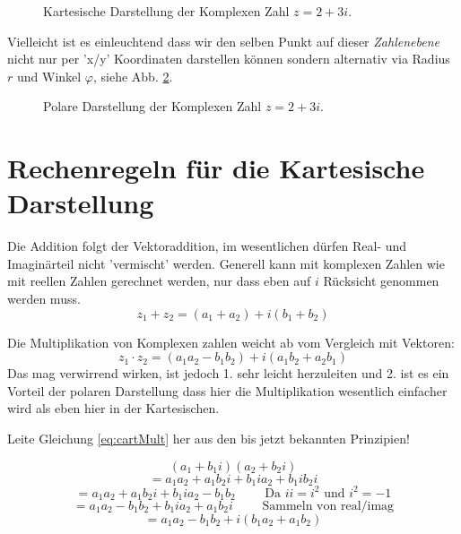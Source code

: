\begin{figure}[h]
	\centering
	
	\caption{Kartesische Darstellung der Komplexen Zahl $z = 2 + 3i$.}
	\label{fig:komp_kart}
\end{figure}

Vielleicht ist es einleuchtend dass wir den selben Punkt auf dieser \emph{Zahlenebene} nicht nur per 'x/y' Koordinaten darstellen können sondern alternativ via Radius $r$ und Winkel $\varphi$, siehe Abb. \ref{fig:komp_pol}.


\begin{figure}[h]
	\centering
	
	\caption{Polare Darstellung der Komplexen Zahl $z = 2 + 3i$.}
	\label{fig:komp_pol}
\end{figure}




\section{Rechenregeln für die Kartesische Darstellung}

Die Addition folgt der Vektoraddition, im wesentlichen dürfen Real- und Imaginärteil nicht 'vermischt' werden. Generell kann mit komplexen Zahlen wie mit reellen Zahlen gerechnet werden, nur dass eben auf $i$ Rücksicht genommen werden muss.
\begin{equation}
z_1 + z_2 = (a_1 + a_2) + i(b_1 + b_2)
\end{equation}


Die Multiplikation von Komplexen zahlen weicht ab vom Vergleich mit Vektoren:  
\begin{equation}\label{eq:cartMult}
z_1 \cdot z_2 = (a_1 a_2 - b_1 b_2)  + i(a_1 b_2 +a_2 b_1)
\end{equation}
Das mag verwirrend wirken, ist jedoch 1. sehr leicht herzuleiten und 2. ist es ein Vorteil der polaren Darstellung dass hier die Multiplikation wesentlich einfacher wird als eben hier in der Kartesischen. 

\begin{question}
    Leite Gleichung \ref{eq:cartMult} her aus den bis jetzt bekannten Prinzipien! 
\end{question}

\begin{answer}
$$(a_1 + b_1i) (a_2 + b_2i)$$
$$ = a_1a_2 + a_1b_2i + b_1i a_2 +b_1i b_2i$$
$$ = a_1a_2 +  a_1b_2i +b_1i a_2 - b_1 b_2 \qquad\text{ Da } ii = i^2 \text{ und } i^2=-1$$
$$ = a_1a_2 - b_1 b_2 + b_1i a_2 + a_1b_2i  \qquad\text{ Sammeln von real/imag}$$
$$ = a_1a_2 - b_1 b_2 +  i (b_1 a_2 + a_1b_2)$$
\end{answer}


